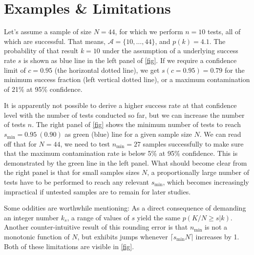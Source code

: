 \documentclass[11pt]{scrartcl}
\begin{document}
\section*{Examples \& Limitations}

Let's assume a sample of size $N=44$, for which we perform $n=10$ tests, all of which are successful. That means, $\mathcal{A}=\lbrace 10,\dotsc,44\rbrace$, and $p(k) = 4.1$. The probability of that result $k=10$ under the assumption of a underlying success rate $s$ is shown as blue line in the left panel of \autoref{fig}. If we require a confidence limit of $c=0.95$ (the horizontal dotted line), we get $s(c=0.95) = 0.79$ for the minimum success fraction (left vertical dotted line), or a maximum contamination of 21\% at 95\% confidence. 

It is apparently not possible to derive a higher success rate at that confidence level with the number of tests conducted so far, but we can increase the number of tests $n$. The right panel of \autoref{fig} shows the minimum number of tests to reach $s_\textrm{min}=0.95\ (0.90)$ as green (blue) line for a given sample size $N$. We can read off that for $N=44$, we need to test $n_\textrm{min}=27$ samples successfully to make sure that the maximum contamination rate is below 5\% at 95\% confidence. This is demonstrated by the green line in the left panel. What should become clear from the right panel is that for small samples sizes $N$, a proportionally large number of tests have to be performed to reach any relevant $s_\textrm{min}$, which becomes increasingly impractical if untested samples are to remain for later studies.

Some oddities are worthwhile mentioning: As a direct consequence of demanding an integer number $k_s$, a range of values of $s$ yield the same $p(K/N\geq s | k)$. Another counter-intuitive result of this rounding error is that $n_\textrm{min}$ is not a monotonic function of $N$, but exhibits jumps whenever $\lceil s_\textrm{min}N\rceil$ increases by 1. Both of these limitations are visible in \autoref{fig}.
\end{document}
